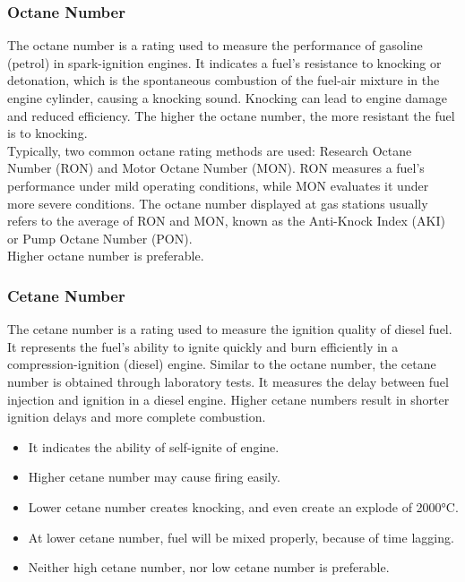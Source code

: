 \documentclass{article}
\begin{document}
\subsubsection*{Octane Number}
The octane number is a rating used to measure the performance of gasoline (petrol) in spark-ignition engines. It indicates a fuel's resistance to knocking or detonation, which is the spontaneous combustion of the fuel-air mixture in the engine cylinder, causing a knocking sound. Knocking can lead to engine damage and reduced efficiency. The higher the octane number, the more resistant the fuel is to knocking.\\
Typically, two common octane rating methods are used: Research Octane Number (RON) and Motor Octane Number (MON). RON measures a fuel's performance under mild operating conditions, while MON evaluates it under more severe conditions. The octane number displayed at gas stations usually refers to the average of RON and MON, known as the Anti-Knock Index (AKI) or Pump Octane Number (PON).\\
Higher octane number is preferable. 


\subsubsection*{Cetane Number}
The cetane number is a rating used to measure the ignition quality of diesel fuel. It represents the fuel's ability to ignite quickly and burn efficiently in a compression-ignition (diesel) engine. Similar to the octane number, the cetane number is obtained through laboratory tests. It measures the delay between fuel injection and ignition in a diesel engine. Higher cetane numbers result in shorter ignition delays and more complete combustion.
\begin{itemize}
  \item It indicates the ability of self-ignite of engine.
  \item Higher cetane number may cause firing easily. 
  \item Lower cetane number creates knocking, and even create an explode of 2000°C.
  \item At lower cetane number, fuel will be mixed properly, because of time lagging. 
  \item Neither high cetane number, nor low cetane number is preferable. 
\end{itemize}
\end{document}
